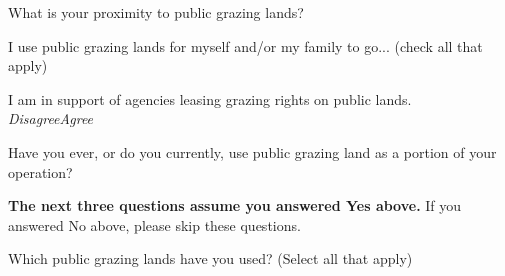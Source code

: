 \documentclass[
  english,
  checkmode = fill,
  ]{sdapsclassic}
\begin{document}
\begin{questionnaire}
    \begin{choicequestion}[cols=5]{What is your proximity to public grazing lands?}
    \end{choicequestion}
    
     \begin{markgroup}{I use public grazing lands for myself and/or my family to go... (check all that apply)}
    \end{markgroup}   
    
    
     \begin{markgroup}{ I am in support of agencies leasing grazing rights on public lands.}
      \markline{ }
 	{\emph{Disagree}}{\emph{Agree}~~}~{}~{}
      \end{markgroup}
    
    \begin{choicequestion}[cols=4]{Have you ever, or do you currently, use public grazing land as a portion of your operation?}
    \end{choicequestion}

\textbf{The next three questions assume you answered Yes above.} If you answered No above, please skip these questions.
    
    
    \begin{choicequestion}[cols=2]{Which public grazing lands have you used? (Select all that apply)}
    \end{choicequestion}
    

\end{questionnaire}
\end{document}
